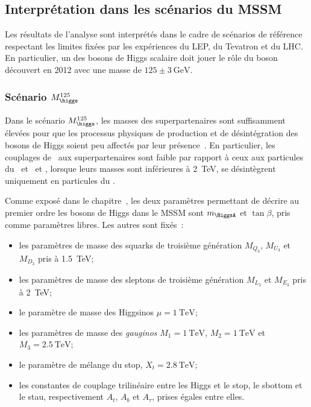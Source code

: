 \subsection{Interprétation dans les scénarios du MSSM}\label{chapter-HTT_analysis-section-signal_extraction-benchmarks}
Les résultats de l'analyse sont interprétés dans le cadre de scénarios de référence~\cite{Bagnaschi_2019}
respectant les limites fixées par les expériences du LEP, du Tevatron et du LHC.
En particulier, un des bosons de Higgs scalaire doit jouer le rôle du boson découvert en 2012 avec une masse de $\num{125}\pm\SI{3}{\GeV}$.
\subsubsection{Scénario $M_{\higgs}^{125}$}\label{chapter-HTT_analysis-section-signal_extraction-benchmarks-mh125}
Dans le scénario $M_{\higgs}^{125}$,
les masses des superpartenaires sont suffisamment élevées
pour que les processus physiques de production et de désintégration
des bosons de Higgs soient peu affectés par leur présence~\cite{Bagnaschi_2019}.
En particulier, les couplages de \higgs\ aux superpartenaires
sont faible par rapport à ceux aux particules du \SM\
et
\Higgs\ et \HiggsA, lorsque leurs masses sont inférieures à \SI{2}{\TeV},
se désintègrent uniquement en particules du \SM.
\par
Comme exposé dans le chapitre~,
les deux paramètres permettant de décrire au premier ordre les bosons de Higgs dans le MSSM
sont $m_{\HiggsA}$ et $\tan\beta$,
pris comme paramètres libres.
Les autres sont fixés~\cite{Bagnaschi_2019}:
\begin{itemize}
\item les paramètres de masse des squarks de troisième génération $M_{Q_3}$, $M_{U_3}$ et $M_{D_3}$ pris à \SI{1.5}{\TeV};
\item les paramètres de masse des sleptons de troisième génération $M_{L_3}$ et $M_{E_3}$ pris à \SI{2}{\TeV};
\item le paramètre de masse des Higgsinos $\mu=\SI{1}{\TeV}$;
\item les paramètres de masse des \emph{gauginos} $M_1=\SI{1}{\TeV}$, $M_2=\SI{1}{\TeV}$ et $M_3=\SI{2.5}{\TeV}$;
\item le paramètre de mélange du stop, $X_t=\SI{2.8}{\TeV}$;
\item les constantes de couplage trilinéaire entre les Higgs et le stop, le sbottom et le stau, respectivement $A_t$, $A_b$ et $A_\tau$, prises égales entre elles.
\end{itemize}
